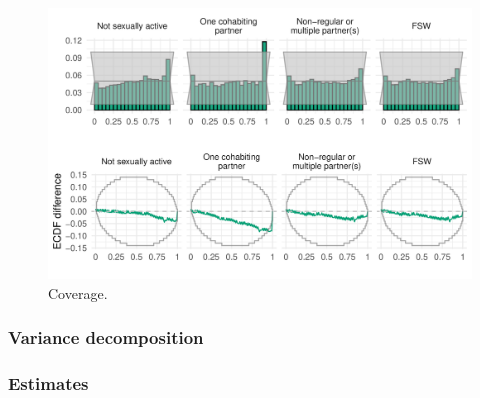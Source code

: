 \documentclass[a4paper, nobind]{templates/ociamthesis}
\begin{document}
\begin{figure}

{\centering \includegraphics[width=0.95\linewidth]{resources/multi-agyw/20230627-144735-3da88508/depends/coverage} 

}

\caption{Coverage.}\label{fig:coverage}
\end{figure}

\hypertarget{variance-decomposition}{%
\subsubsection{Variance decomposition}\label{variance-decomposition}}

\hypertarget{estimates}{%
\subsubsection{Estimates}\label{estimates}}
\end{document}

